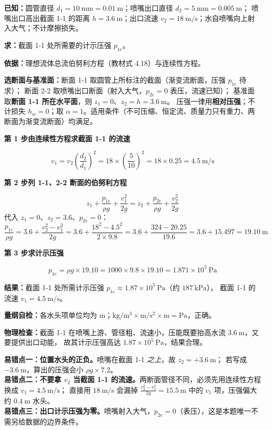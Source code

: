 \begin{jie}
\textbf{已知：}圆管直径 $d_1=10\ \mathrm{mm}=0.01\ \mathrm{m}$；喷嘴出口直径 $d_2=5\ \mathrm{mm}=0.005\ \mathrm{m}$；
喷嘴出口高出截面 1-1 的距离 $h=3.6\ \mathrm{m}$；出口流速 $v_2=18\ \mathrm{m/s}$；水自喷嘴向上射入大气；不计摩擦损失。

\textbf{求：}截面 1-1 处所需要的计示压强 $p_{1e}$。

\textbf{依据：}理想流体总流伯努利方程（教材式 4.18）与连续性方程。

\textbf{选断面与基准面：}断面 1-1 取圆管上所标注的截面（渐变流断面，压强 $p_{1e}$ 待求）；
断面 2-2 取喷嘴出口断面（射入大气，$p_{2e}=0$ 表压，流速已知）；
基准面取\textbf{断面 1-1 所在水平面}，则 $z_1=0$、$z_2=h=3.6\ \mathrm{m}$。
压强一律用\textbf{相对压强}；不计损失 $h_w=0$；取 $\alpha=1$。适用条件（不可压缩、恒定流、质量力只有重力、两断面为渐变流断面）均满足。

\textbf{第 1 步\quad 由连续性方程求截面 1-1 的流速}

\[ v_1=v_2\left(\frac{d_2}{d_1}\right)^2=18\times\left(\frac{5}{10}\right)^2=18\times0.25=4.5\ \mathrm{m/s} \]

\textbf{第 2 步\quad 列 1-1、2-2 断面的伯努利方程}

\[ z_1+\frac{p_{1e}}{\rho g}+\frac{v_1^2}{2g}=z_2+\frac{p_{2e}}{\rho g}+\frac{v_2^2}{2g} \]
代入 $z_1=0$、$z_2=3.6$、$p_{2e}=0$：
\[ \frac{p_{1e}}{\rho g}=3.6+\frac{v_2^2-v_1^2}{2g}
   =3.6+\frac{18^2-4.5^2}{2\times9.8}=3.6+\frac{324-20.25}{19.6}=3.6+15.497=19.10\ \mathrm{m} \]

\textbf{第 3 步\quad 求计示压强}

\[ p_{1e}=\rho g\times19.10=1000\times9.8\times19.10=1.871\times10^5\ \mathrm{Pa} \]

\textbf{结果：}截面 1-1 处所需计示压强 $p_{1e}\approx1.87\times10^5\ \mathrm{Pa}$（约 $187\ \mathrm{kPa}$），
截面 1-1 的流速 $v_1=4.5\ \mathrm{m/s}$。

\textbf{量纲自检：}各水头项单位均为 $\mathrm{m}$；$\mathrm{kg/m^3\times m/s^2\times m}=\mathrm{Pa}$，正确。

\textbf{物理检查：}截面 1-1 在喷嘴上游、管径粗、流速小，压能既要抬高水流 $3.6\ \mathrm{m}$，又要提供出口动能，
故其计示压强高达 $1.87\times10^5\ \mathrm{Pa}$，结果合理。
\end{jie}

\begin{yicuo}
\textbf{易错点一：位置水头的正负。}喷嘴在截面 1-1 \emph{之上}，故 $z_2=+3.6\ \mathrm{m}$；
若写成 $-3.6\ \mathrm{m}$，算出的压强会小 $\rho g\times7.2$。\\
\textbf{易错点二：不要拿 $v_2$ 当截面 1-1 的流速。}两断面管径不同，必须先用连续性方程换成 $v_1=4.5\ \mathrm{m/s}$；
直接用 $18\ \mathrm{m/s}$ 会漏掉 $\frac{v_2^2-v_1^2}{2g}=15.5\ \mathrm{m}$ 中的 $v_1$ 项，压强偏大约 $0.4\ \mathrm{m}$ 水头。\\
\textbf{易错点三：出口计示压强为零。}喷嘴射入大气，$p_{2e}=0$（表压），这是本题唯一不需另给数据的边界条件。
\end{yicuo}

